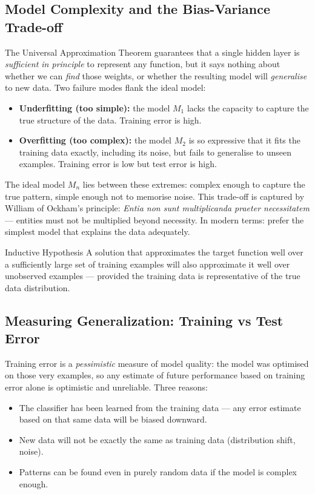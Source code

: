 \documentclass[11pt,a4paper]{article}
\begin{document}
\subsection{Model Complexity and the Bias-Variance Trade-off}

The Universal Approximation Theorem guarantees that a single hidden layer is \emph{sufficient in principle} to represent any function, but it says nothing about whether we can \emph{find} those weights, or whether the resulting model will \emph{generalise} to new data. Two failure modes flank the ideal model:

\begin{itemize}
  \item \textbf{Underfitting (too simple):} the model $M_1$ lacks the capacity to capture the true structure of the data. Training error is high.
  \item \textbf{Overfitting (too complex):} the model $M_2$ is so expressive that it fits the training data exactly, including its noise, but fails to generalise to unseen examples. Training error is low but test error is high.
\end{itemize}

The ideal model $M_n$ lies between these extremes: complex enough to capture the true pattern, simple enough not to memorise noise. This trade-off is captured by William of Ockham's principle: \emph{Entia non sunt multiplicanda praeter necessitatem} --- entities must not be multiplied beyond necessity. In modern terms: prefer the simplest model that explains the data adequately.

\begin{defbox}{Inductive Hypothesis}
A solution that approximates the target function well over a sufficiently large set of training examples will also approximate it well over unobserved examples — provided the training data is representative of the true data distribution.
\end{defbox}

\subsection{Measuring Generalization: Training vs Test Error}

Training error is a \emph{pessimistic} measure of model quality: the model was optimised on those very examples, so any estimate of future performance based on training error alone is optimistic and unreliable. Three reasons:
\begin{itemize}
  \item The classifier has been learned from the training data — any error estimate based on that same data will be biased downward.
  \item New data will not be exactly the same as training data (distribution shift, noise).
  \item Patterns can be found even in purely random data if the model is complex enough.
\end{itemize}
\end{document}
